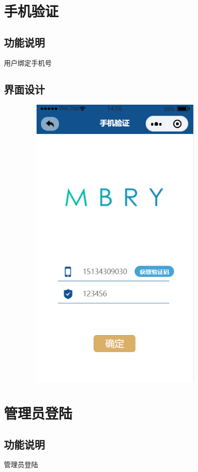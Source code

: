 \section{手机验证}

\subsection{功能说明}
用户绑定手机号
\subsection{界面设计}
\begin{figure}[h]
    \centering 
    \includegraphics[width=10.0cm,height=15.0cm]{design/image/check.png} 
    \end{figure}
\newpage

\newpage

\section{管理员登陆}

\subsection{功能说明}
管理员登陆
